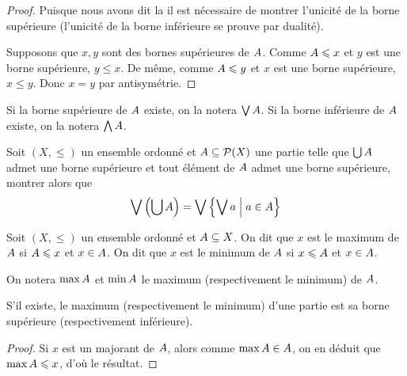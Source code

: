\begin{proof}
  Puisque nous avons dit \og la\fg{} il est nécessaire de montrer l'unicité de
  la borne supérieure (l'unicité de la borne inférieure se prouve par dualité).

  Supposons que $x,y$ sont des bornes supérieures de $A$. Comme
  $A\leqslant x$ et $y$ est une borne supérieure, $y\leq x$. De même, comme
  $A\leqslant y$ et $x$ est une borne supérieure, $x\leq y$. Donc $x = y$ par
  antisymétrie.
\end{proof}

\begin{notation}
  Si la borne supérieure de $A$ existe, on la notera $\bigvee A$. Si la
  borne inférieure de $A$ existe, on la notera $\bigwedge A$.
\end{notation}

\begin{exercise}
  Soit $(X,\leq)$ un ensemble ordonné et $A\subseteq \mathcal{P}(X)$ une
  partie telle que $\bigcup A$ admet une borne supérieure et tout élément
  de $A$ admet une borne supérieure, montrer alors que
  \[\bigvee \left(\bigcup A\right) =
  \bigvee\left\{ \bigvee a \;\middle\vert\; a \in A \right\}\]
\end{exercise}

\begin{definition}
  Soit $(X,\leq)$ un ensemble ordonné et $A\subseteq X$. On dit que $x$ est
  le maximum de $A$ si $A\leqslant x$ et $x\in A$. On dit que $x$ est
  le minimum de $A$ si $x\leqslant A$ et $x\in A$.
\end{definition}

\begin{notation}
  On notera $\max A$ et $\min A$ le maximum (respectivement le
  minimum) de $A$.
  \index[notation]{$\max$}
  \index[notation]{$\min$}
\end{notation}

\begin{property}
  S'il existe, le maximum (respectivement le minimum) d'une partie est sa borne
  supérieure (respectivement inférieure).
\end{property}

\begin{proof}
  Si $x$ est un majorant de $A$, alors comme $\max A \in A$, on
  en déduit que $\max A \leqslant x$, d'où le résultat.
\end{proof}

